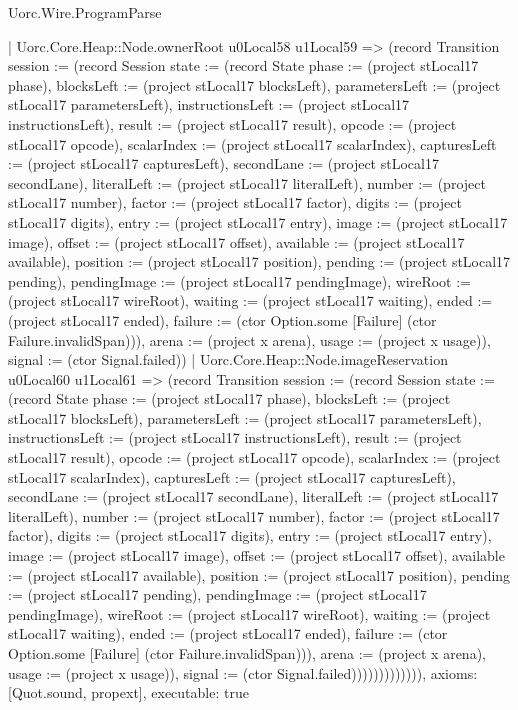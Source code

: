 \begin{lexlean}{Uorc.Wire.ProgramParse}
\begin{semanticmodule}
{          | Uorc.Core.Heap::Node.ownerRoot u0Local58 u1Local59 => (record Transition {session := (record Session {state := (record State {phase := (project stLocal17 phase), blocksLeft := (project stLocal17 blocksLeft), parametersLeft := (project stLocal17 parametersLeft), instructionsLeft := (project stLocal17 instructionsLeft), result := (project stLocal17 result), opcode := (project stLocal17 opcode), scalarIndex := (project stLocal17 scalarIndex), capturesLeft := (project stLocal17 capturesLeft), secondLane := (project stLocal17 secondLane), literalLeft := (project stLocal17 literalLeft), number := (project stLocal17 number), factor := (project stLocal17 factor), digits := (project stLocal17 digits), entry := (project stLocal17 entry), image := (project stLocal17 image), offset := (project stLocal17 offset), available := (project stLocal17 available), position := (project stLocal17 position), pending := (project stLocal17 pending), pendingImage := (project stLocal17 pendingImage), wireRoot := (project stLocal17 wireRoot), waiting := (project stLocal17 waiting), ended := (project stLocal17 ended), failure := (ctor Option.some [Failure] (ctor Failure.invalidSpan))}), arena := (project x arena), usage := (project x usage)}), signal := (ctor Signal.failed)})
          | Uorc.Core.Heap::Node.imageReservation u0Local60 u1Local61 => (record Transition {session := (record Session {state := (record State {phase := (project stLocal17 phase), blocksLeft := (project stLocal17 blocksLeft), parametersLeft := (project stLocal17 parametersLeft), instructionsLeft := (project stLocal17 instructionsLeft), result := (project stLocal17 result), opcode := (project stLocal17 opcode), scalarIndex := (project stLocal17 scalarIndex), capturesLeft := (project stLocal17 capturesLeft), secondLane := (project stLocal17 secondLane), literalLeft := (project stLocal17 literalLeft), number := (project stLocal17 number), factor := (project stLocal17 factor), digits := (project stLocal17 digits), entry := (project stLocal17 entry), image := (project stLocal17 image), offset := (project stLocal17 offset), available := (project stLocal17 available), position := (project stLocal17 position), pending := (project stLocal17 pending), pendingImage := (project stLocal17 pendingImage), wireRoot := (project stLocal17 wireRoot), waiting := (project stLocal17 waiting), ended := (project stLocal17 ended), failure := (ctor Option.some [Failure] (ctor Failure.invalidSpan))}), arena := (project x arena), usage := (project x usage)}), signal := (ctor Signal.failed)})))))))))))),
  axioms: [Quot.sound, propext],
  executable: true
}


\end{semanticmodule}
\end{lexlean}
